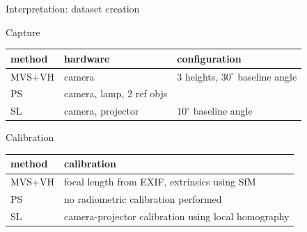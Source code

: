 \documentclass[10pt]{beamer}
\begin{document}
\begin{frame}{Interpretation: dataset creation}

\begin{exampleblock}{Capture}
  \begin{table}
    \begin{tabular}{l|l|l}
    method & hardware & configuration \\
    \midrule
    MVS+VH & camera & 3 heights, $30^\circ$ baseline angle \\
    PS & camera, lamp, 2 ref objs & \\
    SL & camera, projector & $10^\circ$ baseline angle\\
    \end{tabular}
  \end{table}
\end{exampleblock}

\begin{exampleblock}{Calibration}
  \begin{table}
    \begin{tabular}{l|l}
    method & calibration \\
    \midrule
    MVS+VH & focal length from EXIF, extrinsics using SfM \\
    PS & no radiometric calibration performed \\
    SL & camera-projector calibration using local homography \\
    \end{tabular}
  \end{table}
\end{exampleblock}

\end{frame}
\end{document}
